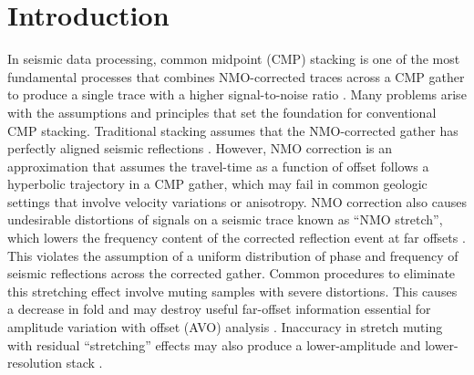 \section{Introduction}
In seismic data processing, common midpoint (CMP) stacking is one of the most fundamental processes
that combines NMO-corrected traces across a CMP gather to produce a single trace with a 
higher signal-to-noise ratio \cite[]{rashed}. 
Many problems arise with the assumptions and principles that set the foundation for conventional CMP stacking. 
Traditional stacking assumes that the NMO-corrected gather has perfectly aligned seismic reflections \cite[]{yilmaz}. 
However, NMO correction is an approximation that assumes the travel-time as a function of offset follows a 
hyperbolic trajectory in a CMP gather, which may fail in common geologic settings that involve 
velocity variations or anisotropy. NMO correction also causes undesirable distortions of signals on a seismic trace 
known as ``NMO stretch'', which lowers the frequency content of the corrected reflection event at far offsets \cite[]{claerbout3}.
This violates the assumption of a uniform distribution of phase and frequency of 
seismic reflections across the corrected gather. Common procedures to eliminate this stretching effect
involve muting samples with severe distortions. This causes a decrease in fold and may destroy useful 
far-offset information essential for amplitude variation with offset (AVO) analysis \cite[]{swan}. Inaccuracy in stretch
muting with residual ``stretching'' effects may also produce a lower-amplitude and lower-resolution stack \cite[]{miller}.  

